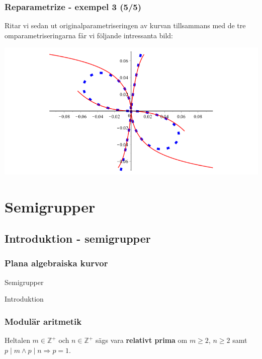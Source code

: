 \documentclass{beamer}
\begin{document}
\begin{frame}
	\frametitle{Reparametrize - exempel 3 (5/5)}
	
	\begin{example}
		Ritar vi sedan ut originalparametriseringen av kurvan tillsammans med de tre omparametriseringarna får vi följande intressanta bild:

		\begin{center}
			\includegraphics[scale=0.35]{Export/kurvorplot2d3.png}
		\end{center}
	\end{example}
\end{frame}








\section{Semigrupper}

\subsection{Introduktion - semigrupper}

\begin{frame}
	\frametitle{Plana algebraiska kurvor}
	\begin{center}
		\Large Semigrupper
		
		Introduktion
	\end{center}
\end{frame}

\begin{frame}
	\frametitle{Modulär aritmetik}
\begin{Definition}
	Heltalen $m \in \mathbb{Z}^+$ och $n \in \mathbb{Z}^+$ sägs vara \textbf{relativt prima} om $m \geq 2$, $n \geq 2$ samt $p \mid m \wedge p \mid n \Longrightarrow p = 1$.
\end{Definition}
\end{frame}
\end{document}
